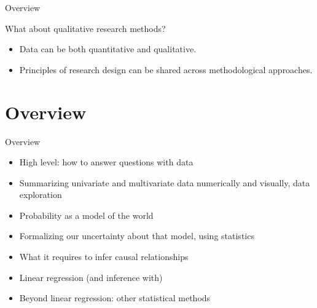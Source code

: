 \documentclass[xcolor={dvipsnames}]{beamer}
\begin{document}
\begin{frame}{Overview}

What about qualitative research methods? \pause
\begin{itemize}
\item Data can be both quantitative and qualitative. \pause
\item Principles of research design can be shared across methodological approaches. 
\end{itemize}

\end{frame}



\section{Overview}
\begin{frame}{Overview}

\begin{itemize}
\item High level: how to answer questions with data \pause
\item Summarizing univariate and multivariate data numerically and visually, data exploration \pause
\item Probability as a model of the world \pause
\item Formalizing our uncertainty about that model, using statistics \pause
\item What it requires to infer causal relationships \pause
\item Linear regression \pause (and inference with) \pause
\item Beyond linear regression: other statistical methods
\end{itemize}

\end{frame}


\end{document}
